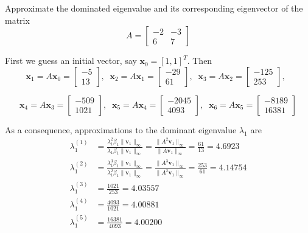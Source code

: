 \begin{ex}
	Approximate the dominated eigenvalue and its corresponding eigenvector of the matrix 
	\[ A = \begin{bmatrix} -2&-3\\ 6&7 \end{bmatrix} \]
	
	First we guess an initial vector, say $\mathbf{x}_0 = [1,1]^T$. Then 
	\[ \mathbf{x}_1 = A\mathbf{x}_0 = \begin{bmatrix} -5\\13 \end{bmatrix},\;\;
	\mathbf{x}_2 = A\mathbf{x}_1 = \begin{bmatrix} -29\\61 \end{bmatrix},\;\;
	\mathbf{x}_3 = A\mathbf{x}_2 = \begin{bmatrix} -125\\253 \end{bmatrix},\;\; \]
	
	\[ \mathbf{x}_4 = A\mathbf{x}_3 = \begin{bmatrix} -509\\1021\end{bmatrix},\;\;
	\mathbf{x}_5 = A\mathbf{x}_4 = \begin{bmatrix} -2045\\4093 \end{bmatrix},\;\;
	\mathbf{x}_6 = A\mathbf{x}_5 = \begin{bmatrix} -8189\\16381\end{bmatrix} \]
	
	As a consequence, approximations to the dominant eigenvalue $\lambda_1$ are
	\begin{align*}
	\lambda_1^{(1)} &= \frac{\lambda_1^2\beta_1\|\mathbf{v}_1\|_{\infty}}{\lambda_1\beta_1\|\mathbf{v}_1\|_{\infty}}
	= \frac{\|A^2\mathbf{v}_1\|_{\infty}}{\|A\mathbf{v}_1\|_{\infty}} 
	= \frac{61}{13} 
	= 4.6923\\
	\lambda_1^{(2)} &= \frac{\lambda_1^3\beta_1\|\mathbf{v}_1\|_{\infty}}{\lambda_1^2\beta_1\|\mathbf{v}_1\|_{\infty}}
	= \frac{\|A^3\mathbf{v}_1\|_{\infty}}{\|A^2\mathbf{v}_1\|_{\infty}} 
	= \frac{253}{61}
	= 4.14754 \\
	\lambda_1^{(3)} &= \frac{1021}{253} = 4.03557\\
	\lambda_1^{(4)} &= \frac{4093}{1021} = 4.00881\\
	\lambda_1^{(5)} &= \frac{16381}{4093} = 4.00200\\
	\end{align*}
	

\end{ex}
